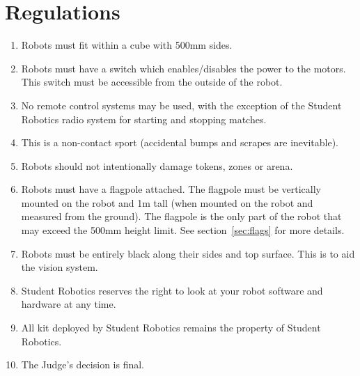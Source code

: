 \section {Regulations}
\label{regs}

\begin{enumerate}
\item Robots must fit within a cube with 500mm sides.
\item Robots must have a switch which enables/disables the power to the motors.  This switch must be accessible from the outside of the robot.
\item No remote control systems may be used, with the exception of the Student Robotics radio system for starting and stopping matches.
\item This is a non-contact sport (accidental bumps and scrapes are inevitable).
\item Robots should not intentionally damage tokens, zones or arena.

\item Robots must have a flagpole attached.  The flagpole must be vertically mounted on the robot and 1m tall (when mounted on the robot and measured from the ground).  The flagpole is the only part of the robot that may exceed the 500mm height limit.  See section~\ref{sec:flags} for more details.

\item Robots must be entirely black along their sides and top surface.  This is to aid the vision system.

\item Student Robotics reserves the right to look at your robot software and hardware at any time.
\item All kit deployed by Student Robotics remains the property of Student Robotics.
\item The Judge's decision is final.
\end{enumerate}
